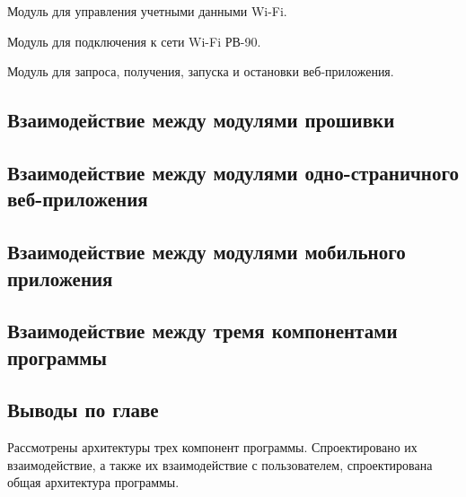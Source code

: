 \begin{my_itemize}
\item Модуль для управления учетными данными Wi-Fi.
\item Модуль для подключения к сети Wi-Fi РВ-90.
\item Модуль для запроса, получения, запуска и остановки веб-приложения.
\end{my_itemize}








\newpage
\subsection{Взаимодействие между модулями прошивки}


\newpage
\subsection{Взаимодействие между модулями одно-страничного веб-приложения}



\newpage
\subsection{Взаимодействие между модулями мобильного приложения}







\newpage
\subsection{Взаимодействие между тремя компонентами программы}







\newpage
\subsection{Выводы по главе}
Рассмотрены архитектуры трех компонент программы. Спроектировано их взаимодействие, а также их взаимодействие с пользователем, спроектирована общая архитектура программы.


